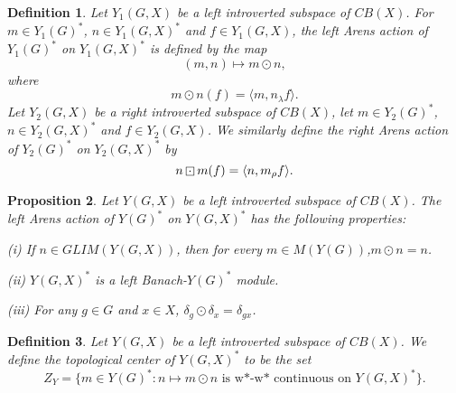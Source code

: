 \documentclass[landscape]{slides}
\newtheorem{defn}{Definition}
\newtheorem{proposition}[defn]{Proposition}
\begin{document}
\begin{slide}
\begin{defn}
Let $Y_1(G,X)$ be a left introverted subspace of $CB(X)$.
For $m\in Y_1(G)^*$, $n\in Y_1(G,X)^*$ and $f\in Y_1(G,X)$, the {\it left Arens action}
of $Y_1(G)^*$ on $Y_1(G,X)^*$ is defined by the map
\[
(m,n) \mapsto m\odot n,
\]
where
\[
m\odot n(f) = \langle m, n_\lambda f\rangle.
\]
Let $Y_2(G,X)$ be a right introverted subspace of $CB(X)$, let
$m\in Y_2(G)^*$, $n\in Y_2(G,X)^*$ and $f\in Y_2(G,X)$.  We similarly define
the {\it right Arens action} of $Y_2(G)^*$ on $Y_2(G,X)^*$ by
\[
n\dotbox m(f) = \langle n, m_\rho f\rangle.
\]
\end{defn}
\end{slide}

\begin{slide}
\begin{proposition}\label{arens:G-inv}
Let $Y(G,X)$ be a left introverted subspace of $CB(X)$.
The left Arens action of $Y(G)^*$ on $Y(G,X)^*$ has the following
properties:
\begin{list}{}{\itemsep -8pt \topsep -5pt}
\item[(i)] If $n\in GLIM(Y(G,X))$, then for every $m\in M(Y(G))$,\linebreak $m\odot n = n$.
\item[(ii)] $Y(G,X)^*$ is a left Banach-$Y(G)^*$ module.
\item[(iii)] For any $g\in G$ and $x\in X$, $\delta_g\odot\delta_x = \delta_{gx}$.\\
\end{list}
\end{proposition}

\begin{defn}
Let $Y(G,X)$ be a left introverted subspace of $CB(X)$.
We define the {\it topological center} of $Y(G,X)^*$ to be the set
\[
Z_Y = \{m\in Y(G)^*:n\mapsto m\odot n\text{ is w*-w* continuous on }Y(G,X)^*\}.
\]
\end{defn}
\end{slide}
\end{document}
